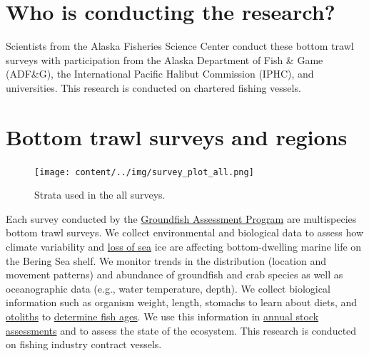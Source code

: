 \documentclass[
  letterpaper,
  oneside,
  open=any]{scrbook}
\begin{document}
\section{Who is conducting the
research?}\label{who-is-conducting-the-research-1}

Scientists from the Alaska Fisheries Science Center conduct these bottom
trawl surveys with participation from the Alaska Department of Fish \&
Game (ADF\&G), the International Pacific Halibut Commission (IPHC), and
universities. This research is conducted on chartered fishing vessels.

\section{Bottom trawl surveys and
regions}\label{bottom-trawl-surveys-and-regions}

\begin{figure}[H]

{\centering \texttt{[image: content/../img/survey\_plot\_all.png]}

}

\caption{Strata used in the all surveys.}

\end{figure}%

Each survey conducted by the
\href{https://www.fisheries.noaa.gov/alaska/population-assessments/north-pacific-groundfish-stock-assessments-and-fishery-evaluation}{Groundfish
Assessment Program} are multispecies bottom trawl surveys. We collect
environmental and biological data to assess how climate variability and
\href{https://www.fisheries.noaa.gov/alaska/ecosystems/habitat-and-ecological-processes-research-regarding-loss-sea-ice}{loss
of sea} ice are affecting bottom-dwelling marine life on the Bering Sea
shelf. We monitor trends in the distribution (location and movement
patterns) and abundance of groundfish and crab species as well as
oceanographic data (e.g., water temperature, depth). We collect
biological information such as organism weight, length, stomachs to
learn about diets, and
\href{https://www.fisheries.noaa.gov/alaska/science-data/alaska-age-and-growth-procedures-otolith-examination}{otoliths}
to
\href{https://www.fisheries.noaa.gov/alaska/science-data/fish-otolith-chronologies}{determine
fish ages}. We use this information in
\href{https://www.fisheries.noaa.gov/alaska/population-assessments/north-pacific-groundfish-stock-assessments-and-fishery-evaluation}{annual
stock assessments} and to assess the state of the ecosystem. This
research is conducted on fishing industry contract vessels.
\end{document}
